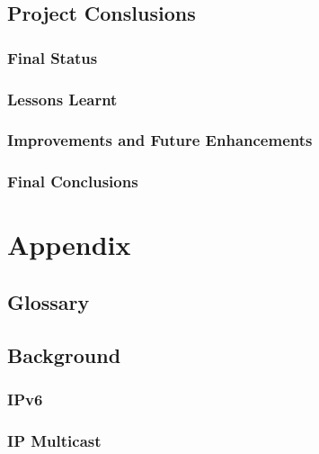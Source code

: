 \documentclass[a4paper,12pt]{report}
\begin{document}
\chapter{Project Conslusions}

\section{Final Status}



\section{Lessons Learnt}



\section{Improvements and Future Enhancements}



\section{Final Conclusions}


\part*{Appendix}

\appendix


\chapter{Glossary}




\chapter{Background}

\section{IPv6}



\section{IP Multicast}
\end{document}
